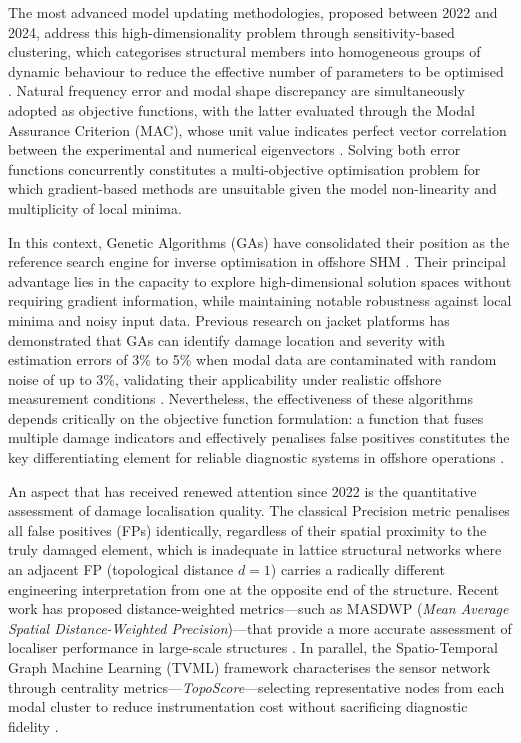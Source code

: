 \documentclass[preprint,12pt]{elsarticle}
\begin{document}
The most advanced model updating methodologies, proposed between 2022 and 2024, address this high-dimensionality problem through sensitivity-based clustering, which categorises structural members into homogeneous groups of dynamic behaviour to reduce the effective number of parameters to be optimised \citep{jiang2024model}. Natural frequency error and modal shape discrepancy are simultaneously adopted as objective functions, with the latter evaluated through the Modal Assurance Criterion (MAC), whose unit value indicates perfect vector correlation between the experimental and numerical eigenvectors \citep{jiang2024model}. Solving both error functions concurrently constitutes a multi-objective optimisation problem for which gradient-based methods are unsuitable given the model non-linearity and multiplicity of local minima.

In this context, Genetic Algorithms (GAs) have consolidated their position as the reference search engine for inverse optimisation in offshore SHM \citep{goldberg1989genetic}. Their principal advantage lies in the capacity to explore high-dimensional solution spaces without requiring gradient information, while maintaining notable robustness against local minima and noisy input data. Previous research on jacket platforms has demonstrated that GAs can identify damage location and severity with estimation errors of 3\% to 5\% when modal data are contaminated with random noise of up to 3\%, validating their applicability under realistic offshore measurement conditions \citep{rahmani2013ga}. Nevertheless, the effectiveness of these algorithms depends critically on the objective function formulation: a function that fuses multiple damage indicators and effectively penalises false positives constitutes the key differentiating element for reliable diagnostic systems in offshore operations \citep{malekzadeh2013damage}.

An aspect that has received renewed attention since 2022 is the quantitative assessment of damage localisation quality. The classical Precision metric penalises all false positives (FPs) identically, regardless of their spatial proximity to the truly damaged element, which is inadequate in lattice structural networks where an adjacent FP (topological distance $d=1$) carries a radically different engineering interpretation from one at the opposite end of the structure. Recent work has proposed distance-weighted metrics---such as MASDWP (\textit{Mean Average Spatial Distance-Weighted Precision})---that provide a more accurate assessment of localiser performance in large-scale structures \citep{li2024reliability}. In parallel, the Spatio-Temporal Graph Machine Learning (TVML) framework characterises the sensor network through centrality metrics---\textit{TopoScore}---selecting representative nodes from each modal cluster to reduce instrumentation cost without sacrificing diagnostic fidelity \citep{ma2024tvml}.
\end{document}
